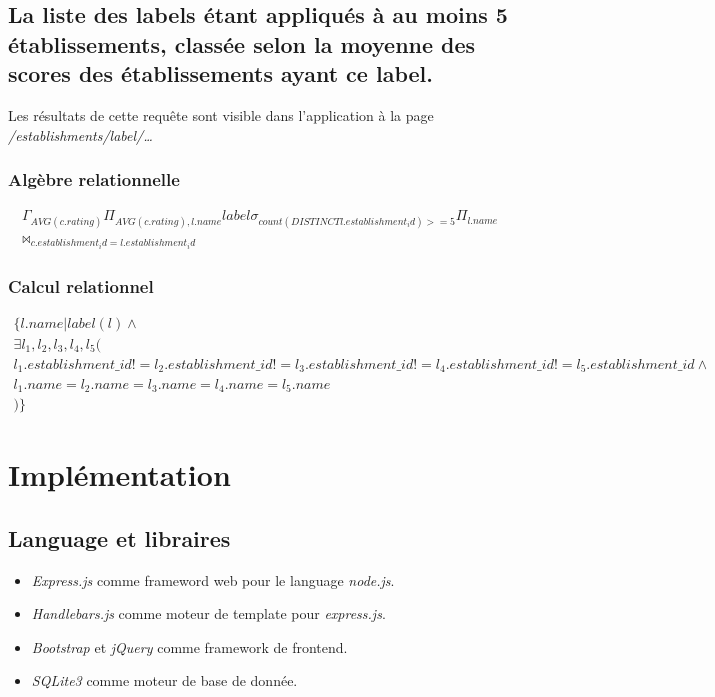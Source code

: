 \documentclass[a4paper,10pt]{article}
\begin{document}
\subsection{La liste des labels étant appliqués à au moins 5 établissements,
classée selon la moyenne des scores des établissements ayant ce label.}
    Les résultats de cette requête sont visible dans l'application à la page
    \emph{/establishments/label/\ldots}
    

\subsubsection{Algèbre relationnelle}
    \begin{align}
        \Gamma_{AVG(c.rating)}\Pi_{AVG(c.rating), l.name}label \sigma_{count(DISTINCT l.establishment_id)>=5}\Pi_{l.name}
        \\\bowtie_{c.establishment_id=l.establishment_id}
    \end{align}

\subsubsection{Calcul relationnel}
\begin{align}
    \{ l.name | label(l) \wedge \\
    \exists l_1, l_2, l_3, l_4, l_5 ( \\
        l_1.establishment\_id != l_2.establishment\_id != l_3.establishment\_id != l_4.establishment\_id != l_5.establishment\_id\wedge \\
        l_1.name = l_2.name = l_3.name = l_4.name = l_5.name \\
    ) \}
\end{align}


\section{Implémentation}
\subsection{Language et libraires}
\begin{itemize}
    \item \emph{Express.js} comme frameword web pour le language \emph{node.js}.
    \item \emph{Handlebars.js} comme moteur de template pour \emph{express.js}.
    \item \emph{Bootstrap} et \emph{jQuery} comme framework de frontend.
    \item \emph{SQLite3} comme moteur de base de donnée.
\end{itemize}
\end{document}
